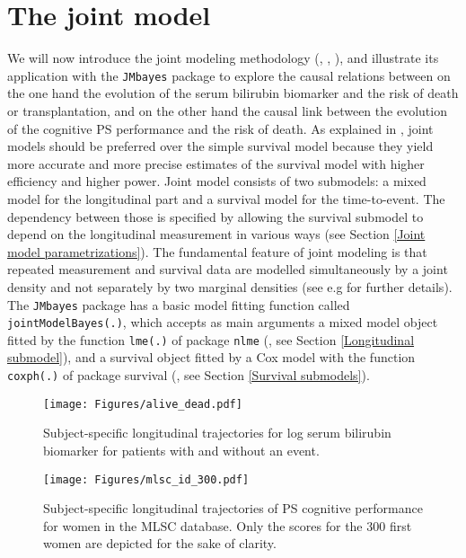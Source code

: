 \documentclass[12pt]{article}
\begin{document}
\section{The joint model}
\label{the model}

We will now introduce the joint modeling methodology (\cite{Henderson2000},  \cite{rizopoulos_book}, \cite{Wulfsohn1997}), and illustrate its application with the \texttt{JMbayes} package to explore the causal relations between on the one hand the evolution of the serum bilirubin biomarker and the risk of death or transplantation, and on the other hand the causal link between the evolution of the cognitive PS performance and the risk of death. As explained in \cite{gould_joint_2015}, joint models should be preferred over the simple survival model because they yield more accurate and more precise estimates of the survival model with higher efficiency and higher power.
Joint model consists of two submodels: a mixed model for the longitudinal part and a survival model for the time-to-event. The dependency between those is specified by allowing the survival submodel to depend on the longitudinal measurement in various ways (see Section \ref{Joint model parametrizations}). The fundamental feature of joint modeling is that repeated measurement and survival data are modelled simultaneously by a joint density and not separately by two marginal densities (see e.g \cite{Rizopoulos_JASA} for further details).
The \texttt{JMbayes} package has a basic model fitting function called \texttt{jointModelBayes(.)}, which accepts as main arguments a mixed model object fitted by the function \texttt{lme(.)} of package \texttt{nlme} (\cite{nlme}, see Section \ref{Longitudinal submodel}), and a survival object fitted by a Cox model with the function
\texttt{coxph(.)} of package survival (\cite{survival-package}, see Section \ref{Survival submodels}).

\begin{figure}[!tb]
\centering
\texttt{[image: Figures/alive\_dead.pdf]}
\caption{Subject-specific longitudinal trajectories for log serum bilirubin biomarker for patients with and without an event.}
\label{alive_dead}
\end{figure}

\begin{figure}[!tb]
\centering
\texttt{[image: Figures/mlsc\_id\_300.pdf]}
\caption{Subject-specific longitudinal trajectories of PS cognitive performance for women in the MLSC database. Only the scores for the 300 first women are depicted for the sake of clarity.}
\label{MLSCalive_dead}
\end{figure}
\end{document}
